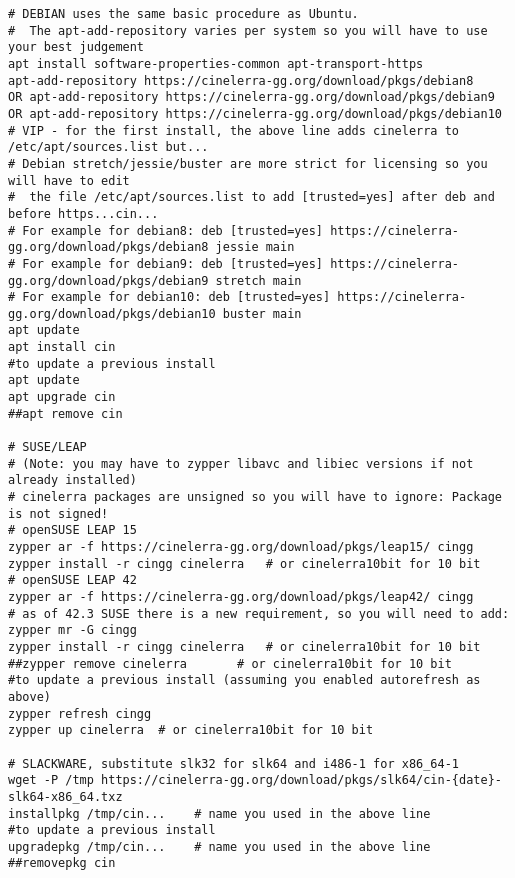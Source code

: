 \begin{lstlisting}[numbers=none]
# DEBIAN uses the same basic procedure as Ubuntu.
#  The apt-add-repository varies per system so you will have to use your best judgement
apt install software-properties-common apt-transport-https
apt-add-repository https://cinelerra-gg.org/download/pkgs/debian8
OR apt-add-repository https://cinelerra-gg.org/download/pkgs/debian9
OR apt-add-repository https://cinelerra-gg.org/download/pkgs/debian10
# VIP - for the first install, the above line adds cinelerra to /etc/apt/sources.list but...
# Debian stretch/jessie/buster are more strict for licensing so you will have to edit
#  the file /etc/apt/sources.list to add [trusted=yes] after deb and before https...cin...
# For example for debian8: deb [trusted=yes] https://cinelerra-gg.org/download/pkgs/debian8 jessie main
# For example for debian9: deb [trusted=yes] https://cinelerra-gg.org/download/pkgs/debian9 stretch main
# For example for debian10: deb [trusted=yes] https://cinelerra-gg.org/download/pkgs/debian10 buster main
apt update
apt install cin
#to update a previous install
apt update
apt upgrade cin
##apt remove cin

# SUSE/LEAP
# (Note: you may have to zypper libavc and libiec versions if not already installed)
# cinelerra packages are unsigned so you will have to ignore: Package is not signed!
# openSUSE LEAP 15
zypper ar -f https://cinelerra-gg.org/download/pkgs/leap15/ cingg
zypper install -r cingg cinelerra   # or cinelerra10bit for 10 bit
# openSUSE LEAP 42
zypper ar -f https://cinelerra-gg.org/download/pkgs/leap42/ cingg
# as of 42.3 SUSE there is a new requirement, so you will need to add:
zypper mr -G cingg
zypper install -r cingg cinelerra   # or cinelerra10bit for 10 bit
##zypper remove cinelerra	    # or cinelerra10bit for 10 bit
#to update a previous install (assuming you enabled autorefresh as above)
zypper refresh cingg
zypper up cinelerra  # or cinelerra10bit for 10 bit

# SLACKWARE, substitute slk32 for slk64 and i486-1 for x86_64-1
wget -P /tmp https://cinelerra-gg.org/download/pkgs/slk64/cin-{date}-slk64-x86_64.txz
installpkg /tmp/cin...    # name you used in the above line
#to update a previous install
upgradepkg /tmp/cin...    # name you used in the above line
##removepkg cin


\end{lstlisting}
